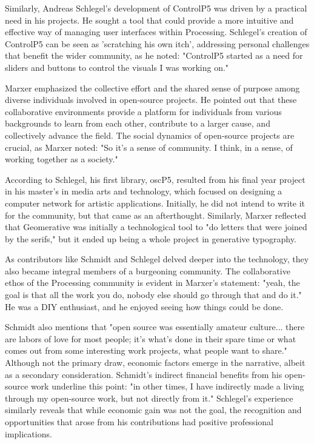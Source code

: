Similarly, Andreas Schlegel's development of ControlP5 was driven by a practical need in his projects. He sought a tool that could provide a more intuitive and effective way of managing user interfaces within Processing. Schlegel's creation of ControlP5 can be seen as 'scratching his own itch', addressing personal challenges that benefit the wider community, as he noted: "ControlP5 started as a need for sliders and buttons to control the visuals I was working on."

Marxer emphasized the collective effort and the shared sense of purpose among diverse individuals involved in open-source projects. He pointed out that these collaborative environments provide a platform for individuals from various backgrounds to learn from each other, contribute to a larger cause, and collectively advance the field. The social dynamics of open-source projects are crucial, as Marxer noted: "So it's a sense of community. I think, in a sense, of working together as a society."

According to Schlegel, his first library, oscP5, resulted from his final year project in his master's in media arts and technology, which focused on designing a computer network for artistic applications. Initially, he did not intend to write it for the community, but that came as an afterthought. Similarly, Marxer reflected that Geomerative was initially a technological tool to "do letters that were joined by the serifs," but it ended up being a whole project in generative typography.

As contributors like Schmidt and Schlegel delved deeper into the technology, they also became integral members of a burgeoning community. The collaborative ethos of the Processing community is evident in Marxer's statement: "yeah, the goal is that all the work you do, nobody else should go through that and do it." He was a DIY enthusiast, and he enjoyed seeing how things could be done. 

Schmidt also mentions that "open source was essentially amateur culture... there are labors of love for most people; it's what's done in their spare time or what comes out from some interesting work projects, what people want to share." Although not the primary draw, economic factors emerge in the narrative, albeit as a secondary consideration. Schmidt's indirect financial benefits from his open-source work underline this point: "in other times, I have indirectly made a living through my open-source work, but not directly from it." Schlegel's experience similarly reveals that while economic gain was not the goal, the recognition and opportunities that arose from his contributions had positive professional implications.


